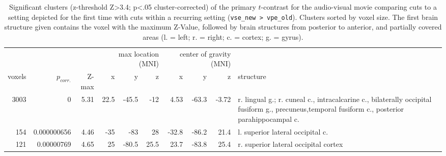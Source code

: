 \documentclass[english]{article}
\begin{document}
\begin{table}[h!]
\caption{Significant clusters (z-threshold Z>3.4; p<.05 cluster-corrected)
    of the primary $t$-contrast for the audio-visual movie comparing cuts to a
    setting depicted for the first time with cuts within a recurring setting
    (\texttt{vse\_new > vpe\_old}).
    Clusters sorted by voxel size.
    The first brain structure given contains the voxel with the maximum Z-Value,
    followed by brain structures from posterior to anterior, and partially
    covered areas (l. = left; r. = right; c. = cortex; g. = gyrus).}
\label{tab:res-av-group1}
\begin{tabular}{rrrrrrrrrp{3cm}}
\toprule
& & & \multicolumn{3}{r}{max location (MNI)} & \multicolumn{3}{r}{center of gravity (MNI)} &
\\ \cmidrule{4-6} \cmidrule{7-9}
voxels & $p_{corr.}$ & Z-max & x & y & z  & x & y & z & structure \\
\midrule
3003 & 0 & 5.31 & 22.5 & -45.5 & -12 & 4.53 & -63.3 & -3.72 & r. lingual g.; r.
cuneal c., intracalcarine c., bilaterally occipital fusiform g., precuneus,temporal fusiform c., posterior parahippocampal c.  \\
154 & 0.000000656 & 4.46 & -35 & -83 & 28 & -32.8 & -86.2 & 21.4 & l. superior lateral occipital c. \\
121 & 0.00000769 & 4.65 & 25 & -80.5 & 25.5 & 23.7 & -83.8 & 25.4 & r. superior lateral occipital cortex \\
\bottomrule
\end{tabular}
\end{table}
\end{document}
